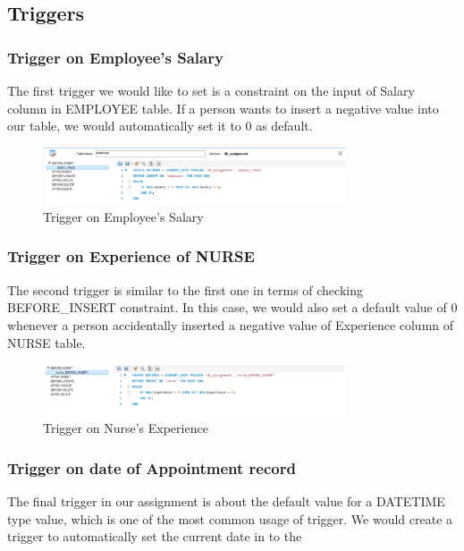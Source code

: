 \subsection{Triggers}

\subsubsection{Trigger on Employee's Salary}
The first trigger we would like to set is a constraint on the input of Salary column in EMPLOYEE table.
If a person wants to insert a negative value into our table, we would automatically set it to 0 as default.

\begin{figure}[H]
  \centering
  \includegraphics[width = 0.8\textwidth]{assets/trigger_1.png}
  \captionsetup{justification=centering,margin=2cm}
  \caption{Trigger on Employee's Salary}
\end{figure}

\subsubsection{Trigger on Experience of NURSE}
The second trigger is similar to the first one in terms of checking BEFORE\_INSERT constraint.
In this case, we would also set a default value of 0 whenever a person accidentally inserted a negative value of Experience column of NURSE table.

\begin{figure}[H]
  \centering
  \includegraphics[width=0.8\textwidth]{assets/trigger_2.png}
  \captionsetup{justification=centering,margin=2cm}
  \caption{Trigger on Nurse's Experience}
\end{figure}

\subsubsection{Trigger on date of Appointment record}

The final trigger in our assignment is about the default value for a DATETIME type value, which is one of the most common usage of trigger.
We would create a trigger to automatically set the current date in to the

